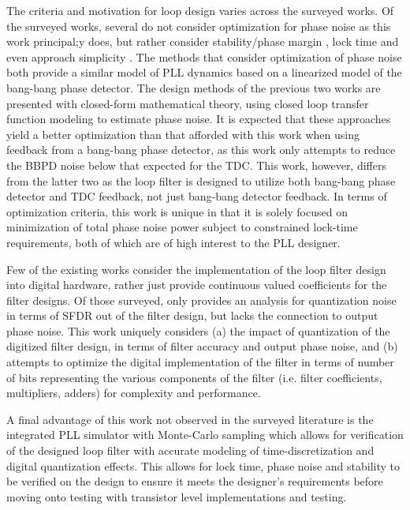 The criteria and motivation for loop design varies across the surveyed works. Of the surveyed works, several \cite{kratyuk_2007}\cite{kumm_klingbeil_zipf_2010}\cite{chau_chen_2009}\cite{safwat_ghoneima_ismail_2011} do not consider optimization for phase noise as this work principal;y does, but rather consider stability/phase margin \cite{kratyuk_2007}\cite{kumm_klingbeil_zipf_2010}\cite{safwat_ghoneima_ismail_2011}, lock time \cite{chau_chen_2009}\cite{safwat_ghoneima_ismail_2011} and even approach simplicity \cite{kumm_klingbeil_zipf_2010}. The methods that consider optimization of phase noise \cite{zanuso_2009}\cite{xu_abidi_2017} both provide a similar model of PLL dynamics based on a linearized model of the bang-bang phase detector. The design methods of the previous two works are presented with closed-form mathematical theory, using closed loop transfer function modeling to estimate phase noise. It is expected that these approaches yield a better optimization than that afforded with this work when using feedback from a bang-bang phase detector, as this work only attempts to reduce the BBPD noise below that expected for the TDC. This work, however, differs from the latter two as the loop filter is designed to utilize both bang-bang phase detector and TDC feedback, not just bang-bang detector feedback. In terms of optimization criteria, this work is unique in that it is solely focused on minimization of total phase noise power subject to constrained lock-time requirements, both of which are of high interest to the PLL designer.

Few of the existing works consider the implementation of the loop filter design into digital hardware, rather just provide continuous valued coefficients for the filter designs. Of those surveyed, only \cite{kumm_klingbeil_zipf_2010} provides an analysis for quantization noise in terms of SFDR out of the filter design, but lacks the connection to output phase noise. This work uniquely considers (a) the impact of quantization of the digitized filter design, in terms of filter accuracy and output phase noise, and (b) attempts to optimize the digital implementation of the filter in terms of number of bits representing the various components of the filter (i.e. filter coefficients, multipliers, adders) for complexity and performance.

A final advantage of this work not observed in the surveyed literature is the integrated PLL simulator with Monte-Carlo sampling which allows for verification of the designed loop filter with accurate modeling of time-discretization and digital quantization effects. This allows for lock time, phase noise and stability to be verified on the design to ensure it meets the designer's requirements before moving onto testing with transistor level implementations and testing.



